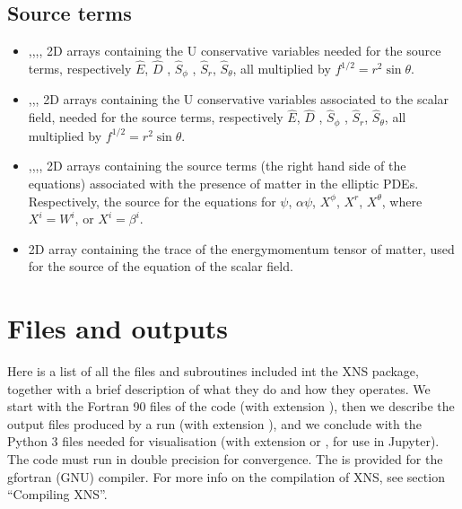 \documentclass[letterpaper,10pt,english]{sphinxmanual}
\begin{document}
\section{Source terms}
\label{\detokenize{arrays:source-terms}}\begin{itemize}
\item {} 
\sphinxAtStartPar
{},,,, \sphinxhyphen{} 2D arrays containing the U conservative variables needed for
the source terms, respectively \(\hat E\), \(\hat D\) , \(\hat S _\phi\) , \(\hat S _r\), \(\hat S _\theta\), all multiplied by \(f ^{1/2} = r^2 \sin \theta\).


\item {} 
\sphinxAtStartPar
{},,, \sphinxhyphen{} 2D arrays containing the U conservative variables associated to the scalar field, needed for the source terms, respectively \(\hat E\), \(\hat D\) , \(\hat S _\phi\) , \(\hat S _r\), \(\hat S _\theta\), all multiplied by \(f ^{1/2} = r^2 \sin \theta\).


\item {} 
\sphinxAtStartPar
{},,,, \sphinxhyphen{} 2D arrays containing the source terms (the right hand side of
the equations) associated with the presence of matter in the elliptic PDEs. Respectively, the source
for the equations for \(\psi\), \(\alpha \psi\), \(X^{\phi}\), \(X^{r}\), \(X^{\theta}\), where \(X^i=W^i\), or \(X^i = \beta ^i\).


\item {} 
\sphinxAtStartPar
{} \sphinxhyphen{} 2D array containing the trace of the energy\sphinxhyphen{}momentum tensor of matter, used for the source of the equation of the scalar field.

\end{itemize}

\sphinxstepscope


\chapter{Files and outputs}
\label{\detokenize{files_outputs:files-and-outputs}}\label{\detokenize{files_outputs::doc}}
\sphinxAtStartPar
Here is a list of all the files and subroutines included int the XNS package, together with a brief
description of what they do and how they operates. We start with the Fortran 90 files of the code (with
extension ), then we describe the output files produced by a run (with extension ), and we conclude
with the Python 3 files needed for visualisation (with extension  or , for use in Jupyter). The code
must run in double precision for convergence. The  is provided for the gfortran (GNU) compiler. For more
info on the compilation of XNS, see section “Compiling XNS”.
\end{document}
